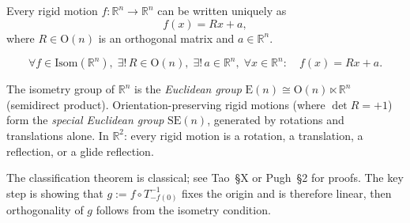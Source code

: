 \begin{tcolorbox}[colback=thmbox, colframe=thmborder, arc=2pt,
  left=6pt, right=6pt, top=4pt, bottom=4pt,
  title={\small\textbf{Theorem (Classification of Euclidean Rigid Motions)}},
  fonttitle=\small\bfseries]
\begin{theorem}
\label{thm:classification-rigid-motions}
Every rigid motion $f : \mathbb{R}^n \to \mathbb{R}^n$ can be written
uniquely as
\[
f(x) = Rx + a,
\]
where $R \in \mathrm{O}(n)$ is an orthogonal matrix and $a \in \mathbb{R}^n$.
\end{theorem}
\end{tcolorbox}

\begin{remark*}
\[
\forall f \in \mathrm{Isom}(\mathbb{R}^n),\;
\exists!\, R \in \mathrm{O}(n),\;
\exists!\, a \in \mathbb{R}^n,\;
\forall x \in \mathbb{R}^n:\quad
f(x) = Rx + a.
\]
\end{remark*}

\begin{remark*}[Consequence]
The isometry group of $\mathbb{R}^n$ is the \emph{Euclidean group}
$\mathrm{E}(n) \cong \mathrm{O}(n) \ltimes \mathbb{R}^n$
(semidirect product).
Orientation-preserving rigid motions (where $\det R = +1$) form the
\emph{special Euclidean group} $\mathrm{SE}(n)$, generated by rotations
and translations alone.
In $\mathbb{R}^2$: every rigid motion is a rotation, a translation,
a reflection, or a glide reflection.
\end{remark*}

\begin{remark*}
The classification theorem is classical; see Tao~\S{}X or Pugh~\S{}2
for proofs. The key step is showing that $g := f \circ T_{-f(0)}^{-1}$
fixes the origin and is therefore linear, then orthogonality of $g$
follows from the isometry condition.
\end{remark*}